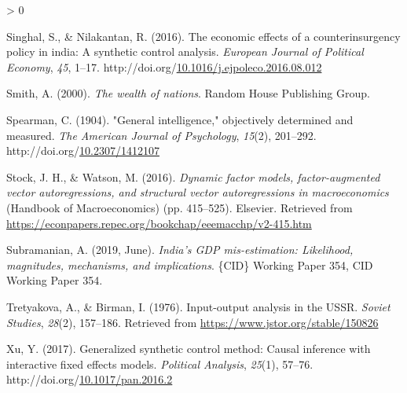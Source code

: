 \documentclass[12pt,nobind, a4paper]{reedthesis}
\newlength{\cslhangindent}
\newenvironment{CSLReferences}[2] %
{%
	\setlength{\parindent}{0pt}
	\ifodd #1 \everypar{\setlength{\hangindent}{\cslhangindent}}\ignorespaces\fi
	\ifnum #2 > 0
	\setlength{\parskip}{#2\baselineskip}
	\fi
}%
{}
\begin{document}
\begin{CSLReferences}{1}{0}
 \leavevmode\hypertarget{ref-singhal_economic_2016}{}%
 Singhal, S., \& Nilakantan, R. (2016). The economic effects of a counterinsurgency policy in india: A synthetic control analysis. \emph{European Journal of Political Economy}, \emph{45}, 1--17. http://doi.org/\href{https://doi.org/10.1016/j.ejpoleco.2016.08.012}{10.1016/j.ejpoleco.2016.08.012}

 \leavevmode\hypertarget{ref-smith_wealth_2000}{}%
 Smith, A. (2000). \emph{The wealth of nations}. Random House Publishing Group.

 \leavevmode\hypertarget{ref-spearman_general_1904}{}%
 Spearman, C. (1904). "General intelligence," objectively determined and measured. \emph{The American Journal of Psychology}, \emph{15}(2), 201--292. http://doi.org/\href{https://doi.org/10.2307/1412107}{10.2307/1412107}

 \leavevmode\hypertarget{ref-stock_dynamic_2016}{}%
 Stock, J. H., \& Watson, M. (2016). \emph{Dynamic factor models, factor-augmented vector autoregressions, and structural vector autoregressions in macroeconomics} (Handbook of Macroeconomics) (pp. 415--525). Elsevier. Retrieved from \url{https://econpapers.repec.org/bookchap/eeemacchp/v2-415.htm}

 \leavevmode\hypertarget{ref-subramanian_indias_2019}{}%
 Subramanian, A. (2019, June). \emph{India's {GDP} mis-estimation: Likelihood, magnitudes, mechanisms, and implications}. \{CID\} Working Paper 354, {CID} Working Paper 354.

 \leavevmode\hypertarget{ref-tretyakova_input-output_1976}{}%
 Tretyakova, A., \& Birman, I. (1976). Input-output analysis in the {USSR}. \emph{Soviet Studies}, \emph{28}(2), 157--186. Retrieved from \url{https://www.jstor.org/stable/150826}

 \leavevmode\hypertarget{ref-xu_generalized_2017}{}%
 Xu, Y. (2017). Generalized synthetic control method: Causal inference with interactive fixed effects models. \emph{Political Analysis}, \emph{25}(1), 57--76. http://doi.org/\href{https://doi.org/10.1017/pan.2016.2}{10.1017/pan.2016.2}

 \end{CSLReferences}
	
	
\end{document}
